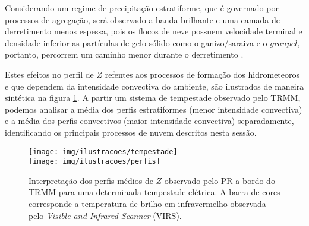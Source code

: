 Considerando um regime de precipitação estratiforme, que é governado por processos de agregação, será observado a banda brilhante e uma camada de derretimento menos espessa, pois os flocos de neve possuem velocidade terminal e densidade inferior  as partículas de gelo sólido como o ganizo/saraiva e o $graupel$, portanto, percorrem um caminho menor durante o derretimento \cite{Fabry1995}. 

Estes efeitos no perfil de $Z$ refentes aos processos de formação dos hidrometeoros e que dependem da intensidade convectiva do ambiente, são ilustrados de maneira sintética na figura \ref{convestraDerr}. A partir um sistema de tempestade observado pelo TRMM, podemos analisar a média dos perfis estratiformes (menor intensidade convectiva) e a média dos perfis convectivos (maior intensidade convectiva) separadamente, identificando os principais processos de nuvem descritos nesta sessão.

\newpage
\begin{figure}[htb]
\centering
\texttt{[image: img/ilustracoes/tempestade]}\\
\texttt{[image: img/ilustracoes/perfis]}
\caption{Interpretação dos perfis médios de $Z$ observado pelo PR a bordo do TRMM para uma determinada tempestade elétrica. A barra de cores corresponde a temperatura de brilho em infravermelho observada pelo \textit{Visible and Infrared Scanner} (VIRS).}
\label{convestraDerr}
\end{figure}




